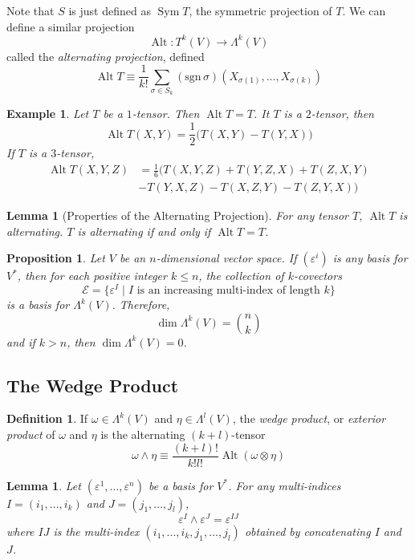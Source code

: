 \documentclass{article}
\DeclareMathOperator{\Sym}{Sym}
\DeclareMathOperator{\Alt}{Alt}
\newtheorem{proposition}[theorem]{Proposition}
\newtheorem{lemma}[theorem]{Lemma}
\newtheorem{example}{Example}[section]
\theoremstyle{remark}
\theoremstyle{definition}
\newtheorem{definition}{Definition}[section]
\begin{document}
Note that $S$ is just defined as $\Sym{T}$, the symmetric projection of $T$. We can define a similar projection 
\[\Alt: T^k (V) \longrightarrow \Lambda^k (V)\]
called the \textit{alternating projection}, defined
\[\Alt{T} \equiv \frac{1}{k!} \sum_{\sigma \in S_k} (\text{sgn}\,\sigma) (X_{\sigma(1)}, ..., X_{\sigma(k)})\]

\begin{example}
Let $T$ be a $1$-tensor. Then $\Alt{T} = T$. It $T$ is a $2$-tensor, then
\[\Alt{T(X, Y)} = \frac{1}{2} \big(T(X, Y) - T(Y, X) \big)\]
If $T$ is a $3$-tensor, 
\begin{align*}
    \Alt{T(X, Y, Z)} & = \frac{1}{6} \big( T(X, Y, Z) + T(Y, Z, X) + T(Z, X, Y) \\ & - T(Y, X, Z) - T(X, Z, Y) - T(Z, Y, X) \big)  
\end{align*}
\end{example}

\begin{lemma}[Properties of the Alternating Projection]
For any tensor $T$, $\Alt{T}$ is alternating. $T$ is alternating if and only if $\Alt{T} = T$. 
\end{lemma}

\begin{proposition}
Let $V$ be an $n$-dimensional vector space. If $(\varepsilon^i)$ is any basis for $V^*$, then for each positive integer $k \leq n$, the collection of $k$-covectors 
\[\mathcal{E} = \{\varepsilon^I \;|\; I \text{ is an increasing multi-index of length } k\}\]
is a basis for $\Lambda^k (V)$. Therefore, 
  \[\dim \Lambda^k (V) = \binom{n}{k}\]
and if $k > n$, then $\dim{\Lambda^k (V)} = 0$. 
\end{proposition}

\subsection{The Wedge Product}

\begin{definition}
If $\omega \in \Lambda^k (V)$ and $\eta \in \Lambda^l (V)$, the \textit{wedge product}, or \textit{exterior product} of $\omega$ and $\eta$ is the alternating $(k+l)$-tensor 
\[\omega \wedge \eta \equiv \frac{(k+l)!}{k! l!} \Alt(\omega \otimes \eta)\]
\end{definition}

\begin{lemma}
Let $(\varepsilon^1, ..., \varepsilon^n)$ be a basis for $V^*$. For any multi-indices $I = (i_1, ..., i_k)$ and $J = (j_1, ..., j_l)$, 
\[\varepsilon^I \wedge \varepsilon^J = \varepsilon^{IJ}\]
where $IJ$ is the multi-index $(i_1, ..., i_k, j_1, ..., j_l)$ obtained by concatenating $I$ and $J$. 
\end{lemma}
\end{document}
